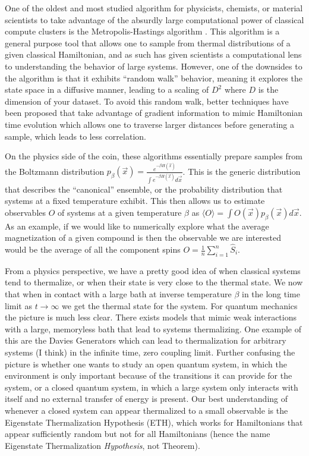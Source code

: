 One of the oldest and most studied algorithm for physicists, chemists, or material scientists to take advantage of the absurdly large computational power of classical compute clusters is the Metropolis-Hastings algorithm \cite{metropolis1953equation}. This algorithm is a general purpose tool that allows one to sample from thermal distributions of a given classical Hamiltonian, and as such has given scientists a computational lens to understanding the behavior of large systems. However, one of the downsides to the algorithm is that it exhibits ``random walk'' behavior, meaning it explores the state space in a diffusive manner, leading to a scaling of $D^2$ where $D$ is the dimension of your dataset. To avoid this random walk, better techniques have been proposed that take advantage of gradient information to mimic Hamiltonian time evolution which allows one to traverse larger distances before generating a sample, which leads to less correlation.

On the physics side of the coin, these algorithms essentially prepare samples from the Boltzmann distribution $p_\beta (\vec{x}) = \frac{e^{-\beta H(\vec{x})}}{\int e^{-\beta H(\vec{x})} d\vec{x}}$. This is the generic distribution that describes the ``canonical'' ensemble, or the probability distribution that systems at a fixed temperature exhibit. This then allows us to estimate observables $O$ of systems at a given temperature $\beta$ as $\langle O \rangle = \int O(\vec{x}) p_\beta (\vec{x}) d\vec{x}$. As an example, if we would like to numerically explore what the average magnetization of a given compound is then the observable we are interested would be the average of all the component spins $O = \frac{1}{n} \sum_{i = 1}^n \hat{S}_i$. 

From a physics perspective, we have a pretty good idea of when classical systems tend to thermalize, or when their state is very close to the thermal state. We now that when in contact with a large bath at inverse temperature $\beta$ in the long time limit as $t \to \infty$ we get the thermal state for the system. For quantum mechanics the picture is much less clear. There exists models that mimic weak interactions with a large, memoryless bath that lead to systems thermalizing. One example of this are the Davies Generators \cite{davies1974markovian} which can lead to thermalization for arbitrary systems (I think) in the infinite time, zero coupling limit. Further confusing the picture is whether one wants to study an open quantum system, in which the environment is only important because of the transitions it can provide for the system, or a closed quantum system, in which a large system only interacts with itself and no external transfer of energy is present. Our best understanding of whenever a closed system can appear thermalized to a small observable is the Eigenstate Thermalization Hypothesis (ETH), which works for Hamiltonians that appear sufficiently random but not for all Hamiltonians (hence the name Eigenstate Thermalization \emph{Hypothesis}, not Theorem). 

